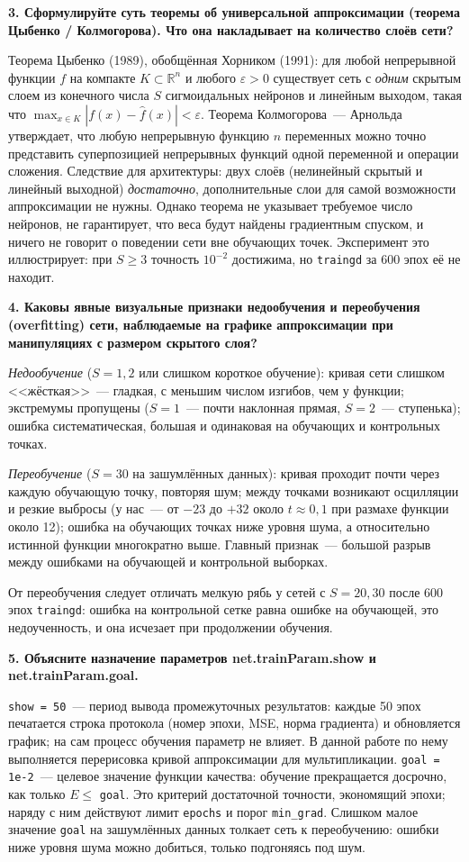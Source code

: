 \documentclass[14pt,a4paper]{extarticle}
\begin{document}
\textbf{3. Сформулируйте суть теоремы об универсальной аппроксимации (теорема Цыбенко / Колмогорова). Что она накладывает на количество слоёв сети?}

Теорема Цыбенко (1989), обобщённая Хорником (1991): для любой непрерывной функции $f$ на компакте $K \subset \mathbb R^n$ и любого $\varepsilon > 0$ существует сеть с \emph{одним} скрытым слоем из конечного числа $S$ сигмоидальных нейронов и линейным выходом, такая что $\max_{x \in K}|f(x) - \hat f(x)| < \varepsilon$. Теорема Колмогорова~--- Арнольда утверждает, что любую непрерывную функцию $n$ переменных можно точно представить суперпозицией непрерывных функций одной переменной и операции сложения. Следствие для архитектуры: двух слоёв (нелинейный скрытый и линейный выходной) \emph{достаточно}, дополнительные слои для самой возможности аппроксимации не нужны. Однако теорема не указывает требуемое число нейронов, не гарантирует, что веса будут найдены градиентным спуском, и ничего не говорит о поведении сети вне обучающих точек. Эксперимент это иллюстрирует: при $S \ge 3$ точность $10^{-2}$ достижима, но \texttt{traingd} за 600 эпох её не находит.

\textbf{4. Каковы явные визуальные признаки недообучения и переобучения (overfitting) сети, наблюдаемые на графике аппроксимации при манипуляциях с размером скрытого слоя?}

\emph{Недообучение} ($S = 1, 2$ или слишком короткое обучение): кривая сети слишком <<жёсткая>>~--- гладкая, с меньшим числом изгибов, чем у функции; экстремумы пропущены ($S = 1$~--- почти наклонная прямая, $S = 2$~--- ступенька); ошибка систематическая, большая и одинаковая на обучающих и контрольных точках.

\emph{Переобучение} ($S = 30$ на зашумлённых данных): кривая проходит почти через каждую обучающую точку, повторяя шум; между точками возникают осцилляции и резкие выбросы (у нас~--- от $-23$ до $+32$ около $t \approx 0{,}1$ при размахе функции около 12); ошибка на обучающих точках ниже уровня шума, а относительно истинной функции многократно выше. Главный признак~--- большой разрыв между ошибками на обучающей и контрольной выборках.

От переобучения следует отличать мелкую рябь у сетей с $S = 20, 30$ после 600 эпох \texttt{traingd}: ошибка на контрольной сетке равна ошибке на обучающей, это недоученность, и она исчезает при продолжении обучения.

\textbf{5. Объясните назначение параметров net.trainParam.show и net.trainParam.goal.}

\texttt{show = 50}~--- период вывода промежуточных результатов: каждые 50 эпох печатается строка протокола (номер эпохи, MSE, норма градиента) и обновляется график; на сам процесс обучения параметр не влияет. В данной работе по нему выполняется перерисовка кривой аппроксимации для мультипликации. \texttt{goal = 1e-2}~--- целевое значение функции качества: обучение прекращается досрочно, как только $E \le$ \texttt{goal}. Это критерий достаточной точности, экономящий эпохи; наряду с ним действуют лимит \texttt{epochs} и порог \texttt{min\_grad}. Слишком малое значение \texttt{goal} на зашумлённых данных толкает сеть к переобучению: ошибки ниже уровня шума можно добиться, только подгоняясь под шум.


\end{document}
